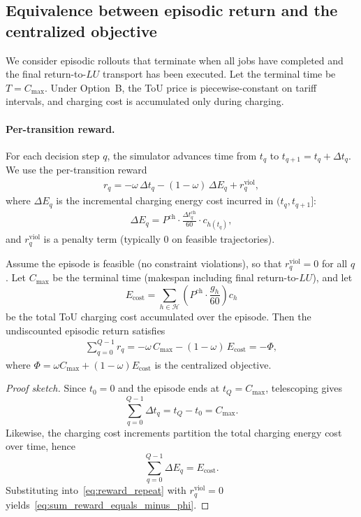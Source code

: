 \documentclass[preprint, 3p, review, 12pt]{elsarticle}
\begin{document}
\subsection{Equivalence between episodic return and the centralized objective}
We consider episodic rollouts that terminate when all jobs have completed and the final return-to-$LU$ transport
has been executed. Let the terminal time be $T=C_{\max}$.
Under Option~B, the ToU price is piecewise-constant on tariff intervals, and charging cost is accumulated only during charging.

\paragraph{Per-transition reward.}
For each decision step $q$, the simulator advances time from $t_q$ to $t_{q+1}=t_q+\Delta t_q$.
We use the per-transition reward
\begin{align}
r_q
=
-\omega\,\Delta t_q
-(1-\omega)\,\Delta E_q
+ r_q^{\mathrm{viol}},
\label{eq:reward_repeat}
\end{align}
where $\Delta E_q$ is the incremental charging energy cost incurred in $(t_q,t_{q+1}]$:
\begin{align}
\Delta E_q
=
P^{\mathrm{ch}}\cdot \frac{\Delta t_q^{\mathrm{ch}}}{60}\cdot c_{h(t_q)},
\label{eq:deltaE_repeat}
\end{align}
and $r_q^{\mathrm{viol}}$ is a penalty term (typically $0$ on feasible trajectories).

\begin{theorem}
\label{thm:return_equivalence}
Assume the episode is feasible (no constraint violations), so that $r_q^{\mathrm{viol}}=0$ for all $q$.
Let $C_{\max}$ be the terminal time (makespan including final return-to-$LU$), and let
\[
E_{\mathrm{cost}}=\sum_{h\in\mathcal{H}}\left(P^{\mathrm{ch}}\cdot \frac{g_h}{60}\right)c_h
\]
be the total ToU charging cost accumulated over the episode.
Then the undiscounted episodic return satisfies
\begin{align}
\sum_{q=0}^{Q-1} r_q
=
-\omega\, C_{\max}
-(1-\omega)\, E_{\mathrm{cost}}
=
-\Phi,
\label{eq:sum_reward_equals_minus_phi}
\end{align}
where $\Phi=\omega C_{\max}+(1-\omega)E_{\mathrm{cost}}$ is the centralized objective.
\end{theorem}

\begin{proof}[Proof sketch]
Since $t_0=0$ and the episode ends at $t_Q=C_{\max}$, telescoping gives
\[
\sum_{q=0}^{Q-1}\Delta t_q = t_Q-t_0 = C_{\max}.
\]
Likewise, the charging cost increments partition the total charging energy cost over time, hence
\[
\sum_{q=0}^{Q-1}\Delta E_q = E_{\mathrm{cost}}.
\]
Substituting into~\eqref{eq:reward_repeat} with $r_q^{\mathrm{viol}}=0$ yields~\eqref{eq:sum_reward_equals_minus_phi}.
\end{proof}
\end{document}
